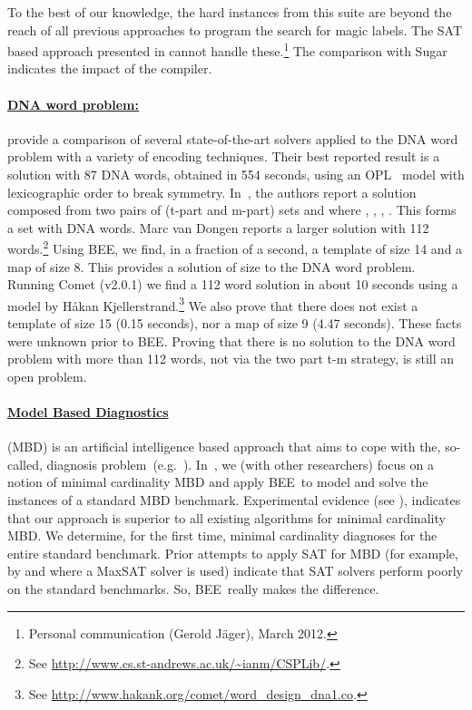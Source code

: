 \documentclass{tlp}
\newcommand{\bee}{\textsf{BEE}}
\begin{document}
To the best of our knowledge, the hard instances from this suite are
beyond the reach of all previous approaches to program the search for
magic labels. The SAT based approach presented in \cite{Jaeger2010}
cannot handle these.\footnote{Personal communication (Gerold J\"ager),
  March 2012.} The comparison with Sugar indicates the impact of the
compiler.  


\vspace{-3mm}
\paragraph{\underline{DNA word problem:}}

 provide a comparison of
several state-of-the-art solvers applied to the DNA word problem with
a variety of encoding techniques. Their best reported result is
a solution with 87 DNA words, obtained in 554 seconds, using an
OPL~\cite{opl} model with lexicographic order to break symmetry.
In~\cite{dnaWordPaper}, the authors report a solution composed from
two pairs of (t-part and m-part) sets  and
 where , , ,
. This forms a set  with 
DNA words.
Marc van Dongen reports a larger solution with 112
words.\footnote{See
  \url{http://www.cs.st-andrews.ac.uk/~ianm/CSPLib/}.}
Using \bee, we find, in a fraction of a second, a template of size 14
and a map of size 8. This provides a solution of size 
to the DNA word problem. Running Comet (v2.0.1) we find a 112 word
solution in about 10 seconds using a model by H\aa kan
Kjellerstrand.\footnote{See
  \url{http://www.hakank.org/comet/word_design_dna1.co}.}
We also prove that there does not exist a template of size 15 (0.15
seconds), nor a map of size 9 (4.47 seconds). These facts were unknown
prior to \bee.
Proving that there is no solution to the DNA word problem with
more than 112 words, not via the two part t-m strategy, is still an
open problem.

\vspace{-3mm}
\paragraph{\underline{Model Based Diagnostics}}

(MBD) is an artificial intelligence based
approach that aims to cope with the, so-called, diagnosis
problem~(e.g.~\cite{Reiter87}). In~\cite{MBD}, we (with other
researchers) focus on a notion of minimal cardinality MBD and apply
\bee\ to model and solve the instances of a standard MBD benchmark.
Experimental evidence (see \cite{MBD}), indicates that our approach is
superior to all existing algorithms for minimal cardinality MBD.  We
determine, for the first time, minimal cardinality diagnoses for the
entire standard benchmark.
Prior attempts to apply SAT for MBD (for example, by 
and  where a MaxSAT solver is used) indicate that
SAT solvers perform poorly on the standard benchmarks.  So, \bee\
really makes the difference.
\end{document}
